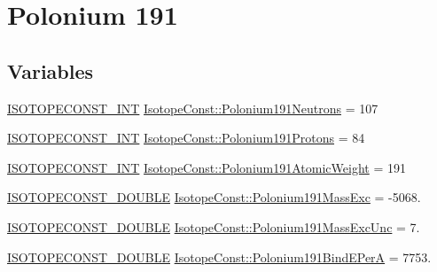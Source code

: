 \hypertarget{group___isotope_const-_polonium-_po191}{}\section{Polonium 191}
\label{group___isotope_const-_polonium-_po191}
\subsection*{Variables}
\begin{DoxyCompactItemize}
\item 
\mbox{\hyperlink{group___isotope_const-_macros_ga5f18360b3e99483a35c32d789e62621c}{I\+S\+O\+T\+O\+P\+E\+C\+O\+N\+S\+T\+\_\+\+I\+NT}} \mbox{\hyperlink{group___isotope_const-_polonium-_po191_ga9fee1a521868d6b234327197aabccfcb}{Isotope\+Const\+::\+Polonium191\+Neutrons}} = 107
\item 
\mbox{\hyperlink{group___isotope_const-_macros_ga5f18360b3e99483a35c32d789e62621c}{I\+S\+O\+T\+O\+P\+E\+C\+O\+N\+S\+T\+\_\+\+I\+NT}} \mbox{\hyperlink{group___isotope_const-_polonium-_po191_ga83a3994599b6ec61432c63e856c72c85}{Isotope\+Const\+::\+Polonium191\+Protons}} = 84
\item 
\mbox{\hyperlink{group___isotope_const-_macros_ga5f18360b3e99483a35c32d789e62621c}{I\+S\+O\+T\+O\+P\+E\+C\+O\+N\+S\+T\+\_\+\+I\+NT}} \mbox{\hyperlink{group___isotope_const-_polonium-_po191_gabca74a9aaa7d4da178033d8fc9769201}{Isotope\+Const\+::\+Polonium191\+Atomic\+Weight}} = 191
\item 
\mbox{\hyperlink{group___isotope_const-_macros_ga8f45a7272ce02c0b4c65c44636ed719a}{I\+S\+O\+T\+O\+P\+E\+C\+O\+N\+S\+T\+\_\+\+D\+O\+U\+B\+LE}} \mbox{\hyperlink{group___isotope_const-_polonium-_po191_ga2b3ed04e3fd2b86d492d7d3811348425}{Isotope\+Const\+::\+Polonium191\+Mass\+Exc}} = -\/5068.
\item 
\mbox{\hyperlink{group___isotope_const-_macros_ga8f45a7272ce02c0b4c65c44636ed719a}{I\+S\+O\+T\+O\+P\+E\+C\+O\+N\+S\+T\+\_\+\+D\+O\+U\+B\+LE}} \mbox{\hyperlink{group___isotope_const-_polonium-_po191_ga2f8759c27abd3ee32c360d992f9af4c3}{Isotope\+Const\+::\+Polonium191\+Mass\+Exc\+Unc}} = 7.
\item 
\mbox{\hyperlink{group___isotope_const-_macros_ga8f45a7272ce02c0b4c65c44636ed719a}{I\+S\+O\+T\+O\+P\+E\+C\+O\+N\+S\+T\+\_\+\+D\+O\+U\+B\+LE}} \mbox{\hyperlink{group___isotope_const-_polonium-_po191_gaf3568167ae19929a800f1466fa3a4d94}{Isotope\+Const\+::\+Polonium191\+Bind\+E\+PerA}} = 7753.
\item 

\end{DoxyCompactItemize}
